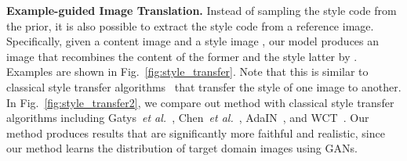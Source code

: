 \documentclass[runningheads]{llncs}
\newcommand{\vpara}[1]{\vspace{0.05in}\noindent\textbf{#1}}
\def\etal{\emph{et al.}\xspace}
\begin{document}
	
\vpara{Example-guided Image Translation.}  
Instead of sampling the style code from the prior, it is also possible to extract the style code from a reference image. Specifically, given a content image  and a style image , our model produces an image  that recombines the content of the former and the style latter by .  Examples are shown in Fig.~\ref{fig:style_transfer}. 
Note that this is similar to classical style transfer algorithms~\cite{gatys2016image,hertzmann2001image,li2016combining,johnson2016perceptual,huang2017adain,li2017universal,li2018closed} that transfer the style of one image to another. 
In Fig.~\ref{fig:style_transfer2}, we compare out method with classical style transfer algorithms including Gatys~\etal~\cite{gatys2016image}, Chen~\etal~\cite{chen2016fast}, AdaIN~\cite{huang2017adain}, and WCT~\cite{li2017universal}. Our method produces results that are significantly more faithful and realistic, since our method learns the distribution of target domain images using GANs.
\end{document}

